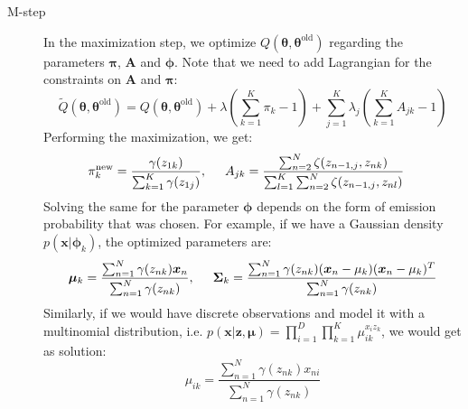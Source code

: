 \begin{itemize}
\begin{description}
		\item[M-step] In the maximization step, we optimize $Q(\bm{\theta}, \bm{\theta}^{\text{old}})$ regarding the parameters $\bm{\pi}$, $\bm{A}$ and $\bm{\phi}$. Note that we need to add Lagrangian for the constraints on $\bm{A}$ and $\bm{\pi}$:
		$$\tilde{Q}(\bm{\theta}, \bm{\theta}^{\text{old}}) = Q(\bm{\theta}, \bm{\theta}^{\text{old}}) + \lambda \left(\sum_{k=1}^{K} \pi_k - 1\right) + \sum_{j=1}^{K} \lambda_j \left(\sum_{k=1}^{K} A_{jk} - 1\right)$$
		Performing the maximization, we get:
		\begin{equation*}
			\begin{split}
				\pi_k^{\text{new}} & =\frac{\gamma(z_{1k})}{\sum_{k=1}^{K}\gamma(z_{1j})}, \hspace{5mm} A_{jk} = \frac{\sum_{n=2}^{N} \zeta(z_{n-1,j}, z_{nk})}{\sum_{l=1}^{K}\sum_{n=2}^{N} \zeta(z_{n-1,j}, z_{nl})}
			\end{split}
		\end{equation*}
		Solving the same for the parameter $\bm{\phi}$ depends on the form of emission probability that was chosen. For example, if we have a Gaussian density $p(\bm{x}|\bm{\phi}_k)$, the optimized parameters are:
		$$\bm{\mu}_k=\frac{\sum_{n=1}^{N}\gamma(z_{nk})\bm{x}_n}{\sum_{n=1}^{N}\gamma(z_{nk})}, \hspace{5mm} \bm{\Sigma}_k = \frac{\sum_{n=1}^{N} \gamma(z_{nk})(\bm{x}_n - \mu_{k})(\bm{x}_n - \mu_{k})^T}{\sum_{n=1}^{N} \gamma(z_{nk})}$$
		Similarly, if we would have discrete observations and model it with a multinomial distribution, i.e. $p(\bm{x}|\bm{z},\bm{\mu}) = \prod_{i=1}^{D}\prod_{k=1}^{K} \mu_{ik}^{x_i z_k}$, we would get as solution:
		$$\mu_{ik} = \frac{\sum_{n=1}^{N}\gamma(z_{nk})x_{ni}}{\sum_{n=1}^{N}\gamma(z_{nk})}$$
	\end{description}
	

\end{itemize}
